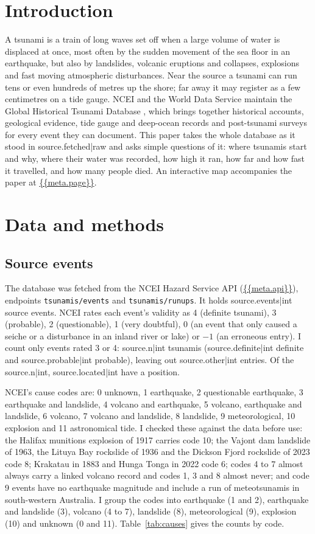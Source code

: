 \documentclass[11pt,a4paper]{article}
\begin{document}
\section{Introduction}
A tsunami is a train of long waves set off when a large volume of water is displaced at once, most often by the sudden movement of the sea floor in an earthquake, but also by landslides, volcanic eruptions and collapses, explosions and fast moving atmospheric disturbances. Near the source a tsunami can run tens or even hundreds of metres up the shore; far away it may register as a few centimetres on a tide gauge. NCEI and the World Data Service maintain the Global Historical Tsunami Database \citep{ncei}, which brings together historical accounts, geological evidence, tide gauge and deep-ocean records and post-tsunami surveys for every event they can document. This paper takes the whole database as it stood in {{source.fetched|raw}} and asks simple questions of it: where tsunamis start and why, where their water was recorded, how high it ran, how far and how fast it travelled, and how many people died. An interactive map accompanies the paper at \url{{{meta.page}}}.

\section{Data and methods}
\subsection{Source events}
The database was fetched from the NCEI Hazard Service API (\url{{{meta.api}}}), endpoints \texttt{tsunamis/events} and \texttt{tsunamis/runups}. It holds {{source.events|int}} source events. NCEI rates each event's validity as 4 (definite tsunami), 3 (probable), 2 (questionable), 1 (very doubtful), 0 (an event that only caused a seiche or a disturbance in an inland river or lake) or $-1$ (an erroneous entry). I count only events rated 3 or 4: {{source.n|int}} tsunamis ({{source.definite|int}} definite and {{source.probable|int}} probable), leaving out {{source.other|int}} entries. Of the {{source.n|int}}, {{source.located|int}} have a position.

NCEI's cause codes are: 0 unknown, 1 earthquake, 2 questionable earthquake, 3 earthquake and landslide, 4 volcano and earthquake, 5 volcano, earthquake and landslide, 6 volcano, 7 volcano and landslide, 8 landslide, 9 meteorological, 10 explosion and 11 astronomical tide. I checked these against the data before use: the Halifax munitions explosion of 1917 carries code 10; the Vajont dam landslide of 1963, the Lituya Bay rockslide of 1936 and the Dickson Fjord rockslide of 2023 code 8; Krakatau in 1883 and Hunga Tonga in 2022 code 6; codes 4 to 7 almost always carry a linked volcano record and codes 1, 3 and 8 almost never; and code 9 events have no earthquake magnitude and include a run of meteotsunamis in south-western Australia. I group the codes into earthquake (1 and 2), earthquake and landslide (3), volcano (4 to 7), landslide (8), meteorological (9), explosion (10) and unknown (0 and 11). Table~\ref{tab:causes} gives the counts by code.
\end{document}
